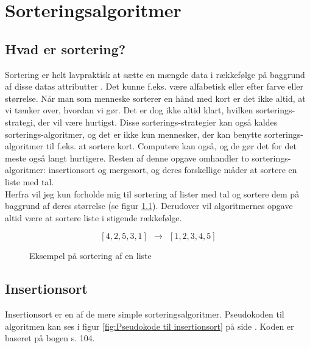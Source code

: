 	\chapter{Sorteringsalgoritmer}
	\label{ch:Sorteringsalgoritmer}

	\section{Hvad er sortering?}
	\label{sec:Hvad er sortering?}



	Sortering er helt lavpraktisk at sætte en mængde data i rækkefølge på baggrund af disse datas attributter \cite{what-is-sorting}. Det kunne f.eks. være alfabetisk eller efter farve eller størrelse. Når man som menneske sorterer en hånd med kort er det ikke altid, at vi tænker over, hvordan vi gør. Det er dog ikke altid klart, hvilken sorterings-strategi, der vil være hurtigst. Disse sorterings-strategier kan også kaldes sorterings-algoritmer, og det er ikke kun mennesker, der kan benytte sorterings-algoritmer til f.eks. at sortere kort. Computere kan også, og de gør det for det meste også langt hurtigere. Resten af denne opgave omhandler to sorterings-algoritmer: insertionsort og mergesort, og deres forskellige måder at sortere en liste med tal.\\

	Herfra vil jeg kun forholde mig til sortering af lister med tal og sortere dem på baggrund af deres størrelse (se figur \ref{fig:Eksempel på sortering af en liste}). Derudover vil algoritmernes opgave altid være at sortere liste i stigende rækkefølge.

	\begin{figure}[h]
		\begin{center}
			$$[4,2,5,3,1] \:\:\longrightarrow\:\: [1,2,3,4,5]$$
		\end{center}
		\caption{Eksempel på sortering af en liste}
		\label{fig:Eksempel på sortering af en liste}
	\end{figure}


	\section{Insertionsort}
	\label{sec:Insertionsort}

	Insertionsort er en af de mere simple sorteringsalgoritmer. Pseudokoden til algoritmen kan ses i figur \ref{fig:Pseudokode til insertionsort} på side \pageref{fig:Pseudokode til insertionsort}. Koden er baseret på bogen  \cite{aogd} s. 104.\\


